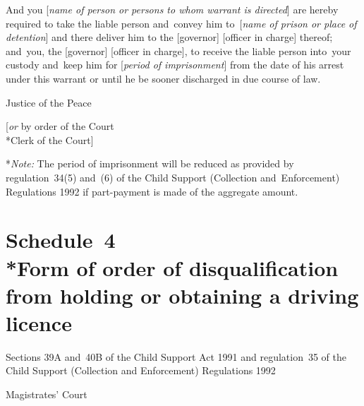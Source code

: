 \documentclass[12pt,a4paper]{article}
\begin{document}
\medskip

And you [\emph{name of person or persons to whom warrant is directed}] are hereby required to take the liable person and~convey him to~[\emph{name of prison or place of detention}] and there deliver him to the [governor] [officer in charge] thereof; and~you, the [governor] [officer in charge], to receive the liable person into~your custody and~keep him for [\emph{period of imprisonment}] from the date of his arrest under this warrant or until he be sooner discharged in due course of law.

\medskip

{\raggedleft Justice of the Peace

\medskip

[\emph{or} by order of the Court\\*Clerk of the Court]

}

\medskip

*\emph{Note:} The period of imprisonment will be reduced as provided by regulation~34(5) and~(6) of the Child Support (Collection and~Enforcement) Regulations 1992 if part-payment is made of the aggregate amount.


\part[Schedule~4 --- Form of order of disqualification from holding or obtaining a driving licence]{Schedule~4\\*Form of order of disqualification from holding or obtaining a driving licence}

\renewcommand\parthead{--- Schedule~4}


\medskip

\noindent
Sections 39A and~40B of the Child Support Act 1991 and regulation~35 of the Child Support (Collection and Enforcement) Regulations 1992

\medskip

{\raggedleft \hspace{0.5\linewidth}\dotfill Magistrates' Court

}
\end{document}
